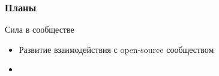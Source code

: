 \begin{frame}
	\frametitle{Планы}

	\begin{block}{Сила в сообществе}

		\begin{itemize}
			\item Развитие взаимодействия с open-source сообществом
			\item 
		\end{itemize}
	\end{block}


\end{frame}

\begin{frame}
	\frametitle{}

\end{frame}

\begin{frame}
	\frametitle{}

\end{frame}

\begin{frame}
	\frametitle{}

\end{frame}


